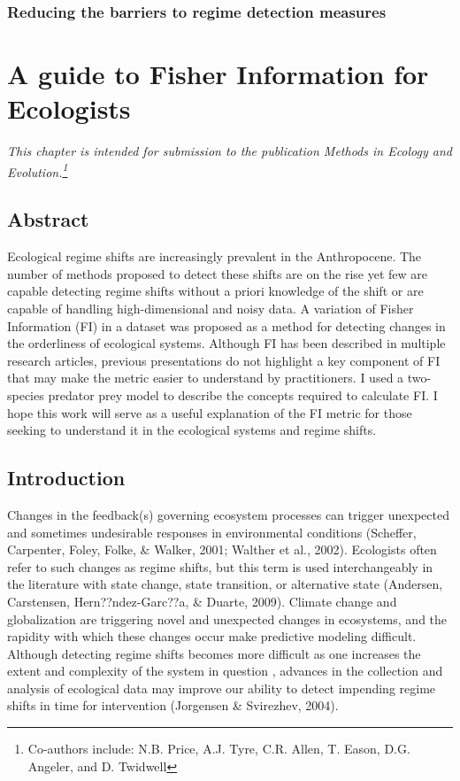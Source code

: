 \documentclass[12pt,twoside,openany]{reedthesis}
\begin{document}
\subsection{Reducing the barriers to regime detection
measures}\label{reducing-the-barriers-to-regime-detection-measures}

\chapter{A guide to Fisher Information for Ecologists}\label{fiGuide}

\emph{This chapter is intended for submission to the publication
\emph{Methods in Ecology and Evolution}.\footnote{Co-authors include:
  N.B. Price, A.J. Tyre, C.R. Allen, T. Eason, D.G. Angeler, and D.
  Twidwell}}

\section{Abstract}\label{abstract}

Ecological regime shifts are increasingly prevalent in the Anthropocene.
The number of methods proposed to detect these shifts are on the rise
yet few are capable detecting regime shifts without a priori knowledge
of the shift or are capable of handling high-dimensional and noisy data.
A variation of Fisher Information (FI) in a dataset was proposed as a
method for detecting changes in the orderliness of ecological systems.
Although FI has been described in multiple research articles, previous
presentations do not highlight a key component of FI that may make the
metric easier to understand by practitioners. I used a two-species
predator prey model to describe the concepts required to calculate FI. I
hope this work will serve as a useful explanation of the FI metric for
those seeking to understand it in the ecological systems and regime
shifts.

\section{Introduction}\label{introduction-1}

Changes in the feedback(s) governing ecosystem processes can trigger
unexpected and sometimes undesirable responses in environmental
conditions (Scheffer, Carpenter, Foley, Folke, \& Walker, 2001; Walther
et al., 2002). Ecologists often refer to such changes as regime shifts,
but this term is used interchangeably in the literature with state
change, state transition, or alternative state (Andersen, Carstensen,
Hern??ndez-Garc??a, \& Duarte, 2009). Climate change and globalization
are triggering novel and unexpected changes in ecosystems, and the
rapidity with which these changes occur make predictive modeling
difficult. Although detecting regime shifts becomes more difficult as
one increases the extent and complexity of the system in question ,
advances in the collection and analysis of ecological data may improve
our ability to detect impending regime shifts in time for intervention
(Jorgensen \& Svirezhev, 2004).
\end{document}
